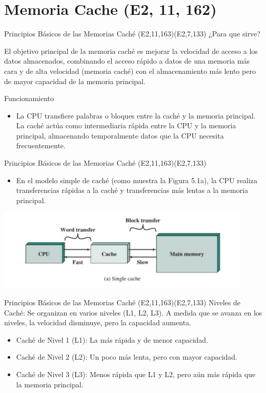 \documentclass[presentation]{beamer}
\begin{document}
\section{Memoria Cache (E2, 11, 162)}
\label{sec:org15c2465}
\begin{frame}[label={sec:org9c20f6a}]{Principios Básicos de las Memorias Caché (E2,11,163)(E2,7,133)}
\alert{\alert{\alert{¿Para que sirve?}}} 


El objetivo principal de la memoria caché es mejorar la velocidad de acceso a los datos almacenados, combinando el acceso rápido a datos de una memoria más cara y de alta velocidad (memoria caché) con el almacenamiento más lento pero de mayor capacidad de la memoria principal.


\alert{\alert{\alert{Funcionamiento}}}


\begin{itemize}
\item La CPU transfiere palabras o bloques entre la caché y la memoria principal. La caché actúa como intermediaria rápida entre la CPU y la memoria principal, almacenando temporalmente datos que la CPU necesita frecuentemente.
\end{itemize}
\end{frame}


\begin{frame}[label={sec:org8717944}]{Principios Básicos de las Memorias Caché (E2,11,163)(E2,7,133)}
\begin{itemize}
\item En el modelo simple de caché (como muestra la Figura 5.1a), la CPU realiza transferencias rápidas a la caché y transferencias más lentas a la memoria principal.
\end{itemize}

\begin{center}
\includegraphics[width=.9\linewidth]{./Imagenes/captura1.png}
\end{center}
\end{frame}

\begin{frame}[label={sec:orgf82c844}]{Principios Básicos de las Memorias Caché (E2,11,163)(E2,7,133)}
Niveles de Caché: Se organizan en varios niveles (L1, L2, L3). A medida que se avanza en los niveles, la velocidad disminuye, pero la capacidad aumenta.

\begin{itemize}
\item Caché de Nivel 1 (L1): La más rápida y de menor capacidad.
\item Caché de Nivel 2 (L2): Un poco más lenta, pero con mayor capacidad.
\item Caché de Nivel 3 (L3): Menos rápida que L1 y L2, pero aún más rápida que la memoria principal.
\end{itemize}
\end{frame}
\end{document}
